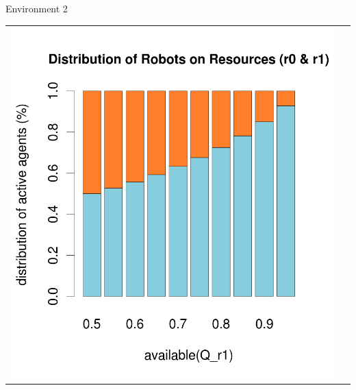 \documentclass[8pt, handout=show,notes=show]{beamer}
\begin{document}
\begin{frame}{Environment 2}
\begin{table}[H]
\begin{tabular}{cc}
\includegraphics[width=\imgSize]{../images/5StaticEnv/barplotAliveR1AndR2_median_env2_normalized}

\end{tabular}
\end{table}
\end{frame}
\end{document}
